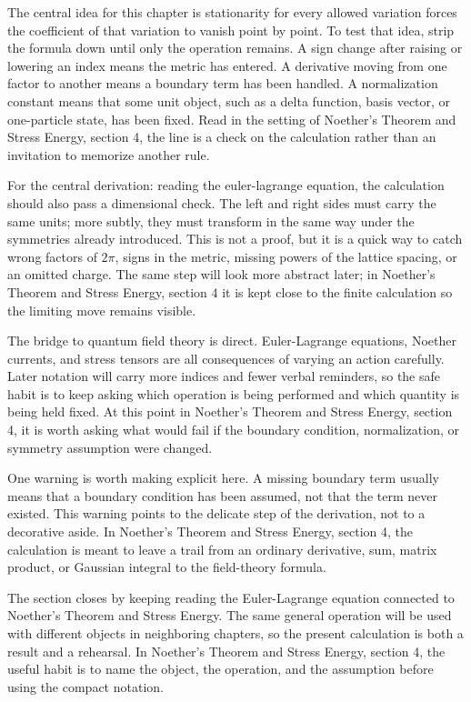 The central idea for this chapter is stationarity for every allowed variation forces the coefficient of that variation to vanish point by point.  To test that idea, strip the formula down until only the operation remains.  A sign change after raising or lowering an index means the metric has entered.  A derivative moving from one factor to another means a boundary term has been handled.  A normalization constant means that some unit object, such as a delta function, basis vector, or one-particle state, has been fixed.  Read in the setting of Noether's Theorem and Stress Energy, section 4, the line is a check on the calculation rather than an invitation to memorize another rule.

For the central derivation: reading the euler-lagrange equation, the calculation should also pass a dimensional check.  The left and right sides must carry the same units; more subtly, they must transform in the same way under the symmetries already introduced.  This is not a proof, but it is a quick way to catch wrong factors of \(2\pi\), signs in the metric, missing powers of the lattice spacing, or an omitted charge.  The same step will look more abstract later; in Noether's Theorem and Stress Energy, section 4 it is kept close to the finite calculation so the limiting move remains visible.

The bridge to quantum field theory is direct.  Euler-Lagrange equations, Noether currents, and stress tensors are all consequences of varying an action carefully.  Later notation will carry more indices and fewer verbal reminders, so the safe habit is to keep asking which operation is being performed and which quantity is being held fixed.  At this point in Noether's Theorem and Stress Energy, section 4, it is worth asking what would fail if the boundary condition, normalization, or symmetry assumption were changed.

One warning is worth making explicit here.  A missing boundary term usually means that a boundary condition has been assumed, not that the term never existed.  This warning points to the delicate step of the derivation, not to a decorative aside.  In Noether's Theorem and Stress Energy, section 4, the calculation is meant to leave a trail from an ordinary derivative, sum, matrix product, or Gaussian integral to the field-theory formula.

The section closes by keeping reading the Euler-Lagrange equation connected to Noether's Theorem and Stress Energy.  The same general operation will be used with different objects in neighboring chapters, so the present calculation is both a result and a rehearsal.  In Noether's Theorem and Stress Energy, section 4, the useful habit is to name the object, the operation, and the assumption before using the compact notation.



